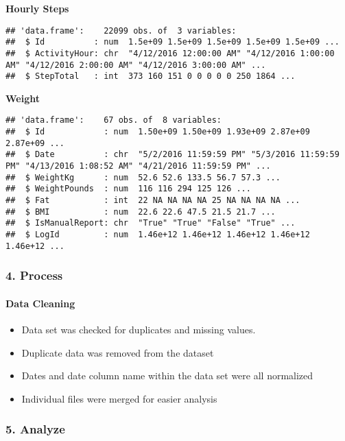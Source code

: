 \documentclass[
]{article}
\providecommand{\tightlist}{%
  \setlength{\itemsep}{0pt}\setlength{\parskip}{0pt}}
\begin{document}
\textbf{Hourly Steps}

\begin{verbatim}
## 'data.frame':    22099 obs. of  3 variables:
##  $ Id          : num  1.5e+09 1.5e+09 1.5e+09 1.5e+09 1.5e+09 ...
##  $ ActivityHour: chr  "4/12/2016 12:00:00 AM" "4/12/2016 1:00:00 AM" "4/12/2016 2:00:00 AM" "4/12/2016 3:00:00 AM" ...
##  $ StepTotal   : int  373 160 151 0 0 0 0 0 250 1864 ...
\end{verbatim}

\textbf{Weight}

\begin{verbatim}
## 'data.frame':    67 obs. of  8 variables:
##  $ Id            : num  1.50e+09 1.50e+09 1.93e+09 2.87e+09 2.87e+09 ...
##  $ Date          : chr  "5/2/2016 11:59:59 PM" "5/3/2016 11:59:59 PM" "4/13/2016 1:08:52 AM" "4/21/2016 11:59:59 PM" ...
##  $ WeightKg      : num  52.6 52.6 133.5 56.7 57.3 ...
##  $ WeightPounds  : num  116 116 294 125 126 ...
##  $ Fat           : int  22 NA NA NA NA 25 NA NA NA NA ...
##  $ BMI           : num  22.6 22.6 47.5 21.5 21.7 ...
##  $ IsManualReport: chr  "True" "True" "False" "True" ...
##  $ LogId         : num  1.46e+12 1.46e+12 1.46e+12 1.46e+12 1.46e+12 ...
\end{verbatim}

\subsubsection{\texorpdfstring{\textbf{4.
Process}}{4. Process}}\label{process}

\paragraph{\texorpdfstring{\textbf{Data
Cleaning}}{Data Cleaning}}\label{data-cleaning}

\begin{itemize}
\tightlist
\item
  Data set was checked for duplicates and missing values.
\item
  Duplicate data was removed from the dataset
\item
  Dates and date column name within the data set were all normalized
\item
  Individual files were merged for easier analysis
\end{itemize}

\subsubsection{\texorpdfstring{\textbf{5.
Analyze}}{5. Analyze}}\label{analyze}
\end{document}
